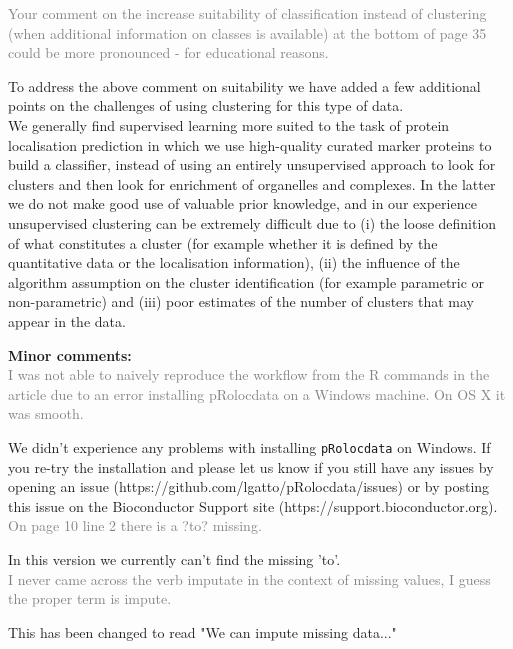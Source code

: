 \documentclass[11pt]{article}
\begin{document}
\textcolor{gray} {Your comment on the increase suitability of classification instead of clustering (when additional information on classes is available) at the bottom of page 35 could be more pronounced - for educational reasons.}

To address the above comment on suitability we have added a few additional points on the challenges of using clustering for this type of data. \\

We generally find supervised learning more suited to the task of protein localisation prediction in which we use high-quality curated marker proteins to build a classifier, instead of using an entirely unsupervised approach to look for clusters and then look for enrichment of organelles and complexes. In the latter we do not make good use of valuable prior knowledge, and in our experience unsupervised clustering can be extremely difficult due to (i) the loose definition of what constitutes a cluster (for example whether it is defined by the quantitative data or the localisation information), (ii) the influence of the algorithm assumption on the cluster identification (for example parametric or non-parametric) and (iii) poor estimates of the number of clusters that may appear in the data. \newline \newline

\textbf{Minor comments:} \\
\textcolor{gray} {I was not able to naively reproduce the workflow from the R commands in the article due to an error installing pRolocdata on a Windows machine. On OS X it was smooth.} 

We didn't experience any problems with installing \texttt{pRolocdata} on Windows. If you re-try the installation and please let us know if you still have any issues by opening an issue (https://github.com/lgatto/pRolocdata/issues) or by posting this issue on the Bioconductor Support site (https://support.bioconductor.org). \\
 
\textcolor{gray} {On page 10 line 2 there is a ?to? missing.} 

In this version we currently can't find the missing 'to'.  \\

\textcolor{gray} {I never came across the verb imputate in the context of missing values, I guess the proper term is impute.} 

This has been changed to read "We can impute missing data..." \\
\end{document}
